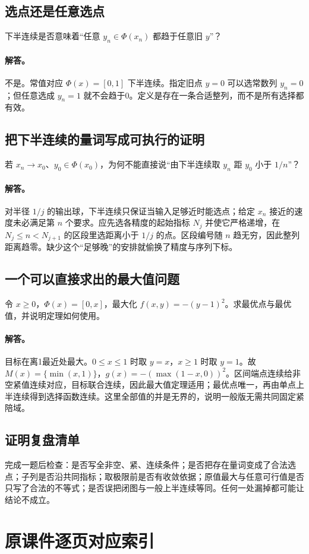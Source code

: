 \subsection{选点还是任意选点}
下半连续是否意味着“任意 $y_n\in\Phi(x_n)$ 都趋于任意旧 $y$”？
\paragraph{解答。}不是。常值对应 $\Phi(x)=[0,1]$ 下半连续。指定旧点 $y=0$ 可以选常数列 $y_n=0$；但任意选成 $y_n=1$ 就不会趋于0。定义是存在一条合适整列，而不是所有选择都有效。
\subsection{把下半连续的量词写成可执行的证明}
若 $x_n\to x_0$、$y_0\in\Phi(x_0)$，为何不能直接说“由下半连续取 $y_n$ 距 $y_0$ 小于 $1/n$”？
\paragraph{解答。}对半径 $1/j$ 的输出球，下半连续只保证当输入足够近时能选点；给定 $x_n$ 接近的速度未必满足第 $n$ 个要求。应先选各精度的起始指标 $N_j$ 并使它严格递增，在 $N_j\le n<N_{j+1}$ 的区段里选距离小于 $1/j$ 的点。区段编号随 $n$ 趋无穷，因此整列距离趋零。缺少这个“足够晚”的安排就偷换了精度与序列下标。
\subsection{一个可以直接求出的最大值问题}
令 $x\ge0$，$\Phi(x)=[0,x]$，最大化 $f(x,y)=-(y-1)^2$。求最优点与最优值，并说明定理如何使用。
\paragraph{解答。}目标在离1最近处最大。$0\le x\le1$ 时取 $y=x$，$x\ge1$ 时取 $y=1$。故 $M(x)=\{\min(x,1)\}$，$g(x)=-(\max(1-x,0))^2$。区间端点连续给非空紧值连续对应，目标联合连续，因此最大值定理适用；最优点唯一，再由单点上半连续得到选择函数连续。这里全部值的并是无界的，说明一般版无需共同固定紧陪域。
\subsection{证明复盘清单}
完成一题后检查：是否写全非空、紧、连续条件；是否把存在量词变成了合法选点；子列是否沿共同指标；取极限前是否有收敛依据；原值最大与任意可行值是否只写了合法的不等式；是否误把闭图与一般上半连续等同。任何一处漏掉都可能让结论不成立。


\clearpage\section{原课件逐页对应索引}

